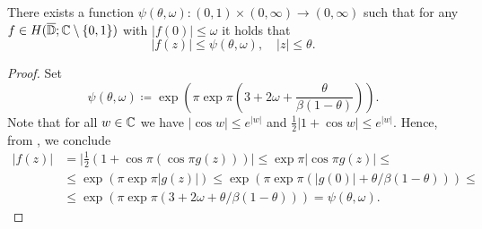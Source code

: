 \begin{theorem}[Schottky] \label{thm:schottky}
    There exists a function ${\psi(\theta, \omega) : (0, 1) \times (0, \infty) \to (0, \infty)}$ such that for any $f \in H(\overline{\mathbb{D}}; \mathbb{C} \setminus \{ 0, 1 \})$ with $\vert f(0) \vert \leq \omega$ it holds that
    \begin{equation}
        \vert f(z) \vert \leq \psi(\theta, \omega), \quad \vert z \vert \leq \theta.
    \end{equation}
\end{theorem}

\begin{proof}
    Set
    \begin{equation*}
        \psi(\theta, \omega) \coloneqq \exp \left( \pi \exp \pi \left( 3 + 2 \omega + \frac{\theta}{\beta (1 - \theta)} \right) \right).
    \end{equation*}
    Note that for all $w \in \mathbb{C}$ we have $\vert \cos w \vert \leq e^{\vert w \vert}$ and $\frac{1}{2} \vert 1 + \cos w \vert \leq e^{\vert w \vert}$. Hence, from , we conclude
    \begin{align*}
        \vert f(z) \vert &= \vert {\textstyle \frac{1}{2}} ( 1 + \cos \pi ( \cos \pi g(z) ) ) \vert \leq \exp \pi \vert \cos \pi g(z) \vert \leq \\
        &\leq \exp ( \pi \exp \pi \vert g(z) \vert ) \leq \exp (\pi \exp \pi (\vert g(0) \vert + \theta / \beta(1 - \theta))) \leq \\
        &\leq \exp ( \pi \exp \pi ( 3 + 2 \omega + \theta / \beta(1 - \theta) ) ) = \psi(\theta, \omega).
    \end{align*}
\end{proof}